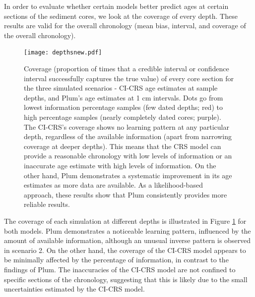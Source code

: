 \documentclass [10pt] {article}
\begin{document}

In order to evaluate whether certain models better predict ages at certain sections of the sediment cores, we look at the coverage of every depth. These results are valid for the overall chronology (mean bias, interval, and coverage of the overall chronology).

\begin{figure}[!]
	\begin{centering}
		\texttt{[image: depthsnew.pdf]}
		\caption{Coverage (proportion of times that a credible interval or confidence interval successfully captures the true value) of every core section for the three simulated scenarios - CI-CRS age estimates at sample depths, and Plum's age estimates at 1 cm intervals. Dots go from lowest information percentage samples (few dated depths; red) to high percentage samples (nearly completely dated cores; purple). The CI-CRS's coverage shows no learning pattern at any particular depth, regardless of the available information (apart from narrowing coverage at deeper depths). This means that the CRS model can provide a reasonable chronology with low levels of information or an inaccurate age estimate with high levels of information. On the other hand, Plum demonstrates a systematic improvement in its age estimates as more data are available. As a likelihood-based approach, these results show that Plum consistently provides more reliable results.  }
		\label{fig:depths}
	\end{centering}
\end{figure}
The coverage of each simulation at different depths is illustrated in Figure \ref{fig:depths} for both models. Plum demonstrates a noticeable learning pattern, influenced by the amount of available information, although an unusual inverse pattern is observed in scenario 2. On the other hand, the coverage of the CI-CRS model appears to be minimally affected by the percentage of information, in contrast to the findings of Plum. The inaccuracies of the CI-CRS model are not confined to specific sections of the chronology, suggesting that this is likely due to the small uncertainties estimated by the CI-CRS model.
\end{document}

